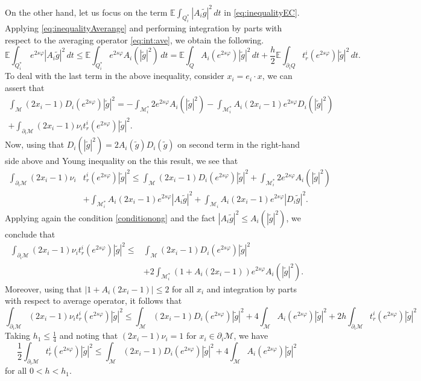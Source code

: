 \documentclass[11pt,oneside,leqno]{amsart}
\numberwithin{equation}{section}
\numberwithin{equation}{section}
\newcommand{\E}{\mathbb{E}}
\begin{document}
On the other hand, let us focus on the term $\displaystyle \E\int_{Q_i^{\ast}}|A_i\tilde{g}|^2\,dt$
in \eqref{eq:inequalityEC}. Applying \eqref{eq:inequalityAverange} and performing integration by parts with respect to the averaging operator \eqref{eq:int:ave}, we obtain the following.
\begin{equation}\label{eq1:Ag}
    \E\int_{Q_i^{\ast}}\,e^{2s\varphi}|A_i\tilde{g}|^2\,dt \leq \E\int_{Q_i^{\ast}}e^{2s\varphi}A_i(|\tilde{g}|^2)\,dt = \E\int_{Q}A_i(e^{2s\varphi})|\tilde{g}|^2\,dt + \frac{h}{2}\E\int_{\partial_i Q}t_r^{i}(e^{2s\varphi})|\tilde{g}|^2\,dt.
\end{equation}
To deal with the last term in the above inequality, consider $x_i=e_{i}\cdot x$, we can assert that
\[
\begin{aligned}
\int_{\mathcal{M}}(2x_i-1)D_i(e^{2s\varphi})|\tilde{g}|^2=-\int_{\mathcal{M}_i^{*}}2e^{2s\varphi}A_i(|\tilde{g}|^2)-\int_{\mathcal{M}_i^*}A_{i}(2x_i-1)e^{2s\varphi}D_i(|\tilde{g}|^2)\\+\int_{\partial_i\mathcal{M}}(2x_{i}-1)\nu_{i}t_{r}^{i}(e^{2s\varphi})|\tilde{g}|^2.
\end{aligned}
\]
Now, using that $D_i(|\tilde{g}|^2)=2A_i(\tilde{g})D_i(\tilde{g})$ on second term in the right-hand side above and Young inequality on the this result, we see that
\[
\begin{aligned}
 \int_{\partial_i\mathcal{M}}(2x_{i}-1)\nu_{i}&t_{r}^{i}(e^{2s\varphi})|\tilde{g}|^2\leq \int_{\mathcal{M}}(2x_i-1)D_i(e^{2s\varphi})|\tilde{g}|^2+\int_{\mathcal{M}_i^{\ast}}2e^{2s\varphi}A_i(|\tilde{g}|^2)\\
 &+\int_{\mathcal{M}_i^{*}}A_i(2x_i-1)e^{2s\varphi}|A_i\tilde{g}|^2+\int_{\mathcal{M}_i}A_i(2x_i-1)e^{2s\varphi}|D_i\tilde{g}|^2.
\end{aligned}
\]
Applying again the condition \eqref{conditionong} and the fact $|A_i\tilde{g}|^2\leq A_i(|\tilde{g}|^2)$, we conclude that
\[
\begin{aligned}
    \int_{\partial_i\mathcal{M}}(2x_{i}-1)\nu_{i}t_{r}^{i}(e^{2s\varphi})|\tilde{g}|^2\leq &\int_{\mathcal{M}}(2x_i-1)D_i(e^{2s\varphi})|\tilde{g}|^2\\
    &+2\int_{\mathcal{M}_i^{\ast}}(1+A_i(2x_i-1))e^{2s\varphi}A_i(|\tilde{g}|^2).
\end{aligned}
\]
Moreover, using that $|1+A_i(2x_i-1)|\leq 2$ for all $x_i$ and integration by parts with respect to average operator, it follows that
\[
\int_{\partial_i\mathcal{M}}(2x_{i}-1)\nu_{i}t_{r}^{i}(e^{2s\varphi})|\tilde{g}|^2\leq \int_{\mathcal{M}}(2x_i-1)D_i(e^{2s\varphi})|\tilde{g}|^2+4\int_{\mathcal{M}}A_i(e^{2s\varphi})|\tilde{g}|^2+2h\int_{\partial_i\mathcal{M}}t_{r}^{i}(e^{2s\varphi})|\tilde{g}|^2
\]
Taking $h_1\leq \frac{1}{4}$ and noting that $(2x_i-1)\nu_i=1$ for $x_i\in \partial_i\mathcal{M}$, we have
\[
\frac{1}{2}\int_{\partial_i\mathcal{M}}t_{r}^{i}(e^{2s\varphi})|\tilde{g}|^2\leq\int_{\mathcal{M}}(2x_i-1)D_i(e^{2s\varphi})|\tilde{g}|^2+4\int_{\mathcal{M}}A_i(e^{2s\varphi})|\tilde{g}|^2
\]
for all $0<h<h_1$.
\end{document}
